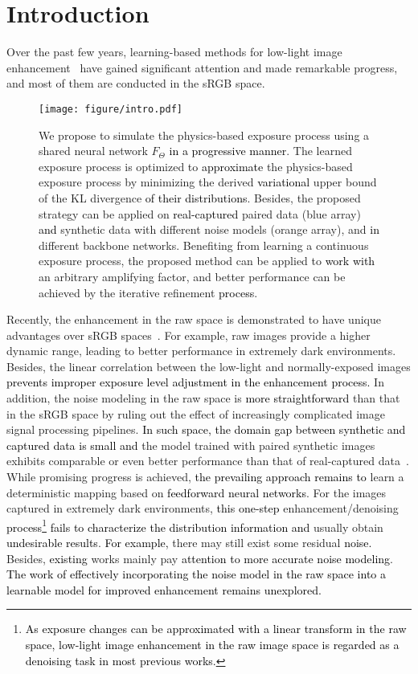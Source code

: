 \documentclass[10pt,twocolumn,letterpaper]{article}
\newcommand{\wh}[1]{\textcolor{black}{#1}}
\begin{document}
\vspace{-0.3cm}
\section{Introduction}
Over the past few years, learning-based methods for low-light image enhancement~\cite{liu2021benchmarking, li2021low, jin2023enhancing} have gained significant attention and made remarkable progress, and most of them are conducted in the sRGB space.
\begin{figure}[t]
    \centering
    \texttt{[image: figure/intro.pdf]} 
    \vspace{-0.65cm}
    \caption{
    We propose to simulate the physics-based exposure process using a shared neural network $F_\Theta$ \wh{in a progressive manner}.
The learned exposure process is optimized to \wh{approximate} the physics-based exposure process by minimizing the derived \wh{variational} upper bound of the KL divergence \wh{of their distributions}.
Besides, the proposed strategy can be applied on \wh{real-captured} paired data (blue array) \wh{and} synthetic data with different noise models (orange array), and \wh{in} different backbone networks. 
Benefiting from learning a continuous exposure process, the proposed method can be applied to \wh{work with} an arbitrary amplifying factor, and better performance can be achieved by the iterative refinement \wh{process}.}
\vspace{-0.5cm}
\end{figure}
Recently, the enhancement in the raw space is demonstrated to have unique advantages over sRGB spaces~\cite{huang2022towards}. For example, raw images provide a higher dynamic range, leading to better performance in extremely dark environments. Besides, the linear correlation between the low-light and normally-exposed images \wh{prevents improper exposure level adjustment in the enhancement process.}
In addition, the noise modeling in the raw space is \wh{more straightforward} than that in the sRGB space by ruling out the effect of increasingly complicated image signal processing pipelines. \wh{In such space, the domain gap between synthetic and captured data is small and} the model trained with paired synthetic images exhibits comparable or even better performance than that of real-captured data~\cite{wei2020physics, feng2022learnability}. 
While promising progress is achieved, \wh{the prevailing approach remains to} learn a deterministic mapping based on \wh{feedforward neural networks}. For the images captured in extremely dark environments, \wh{this one-step} enhancement/denoising \wh{process}\footnote{\wh{As exposure changes can be approximated with a linear transform in the raw space, low-light image enhancement in the raw image space is regarded as a denoising task in most previous works.}} \wh{fails to characterize the distribution information and}
usually obtain \wh{undesirable results}. \wh{For example,} there may still exist some residual \wh{noise.}
Besides, \wh{existing} works mainly pay \wh{attention to more accurate noise modeling}.
\wh{The work of effectively incorporating the noise model in the raw space into a learnable model for improved enhancement remains unexplored.}
\end{document}
